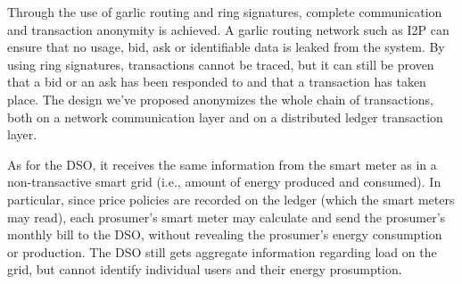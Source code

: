 
Through the use of garlic routing and ring signatures, complete communication and transaction anonymity is achieved. A garlic routing network such as I2P can ensure that no usage, bid, ask or identifiable data is leaked from the system. By using ring signatures, transactions cannot be traced, but it can still be proven that a bid or an ask has been responded to and that a transaction has taken place. The design we've proposed anonymizes the whole chain of transactions, both on a network communication layer and on a distributed ledger transaction layer.

As for the DSO, it receives the same information from the smart meter
as in a non-transactive smart grid (i.e., amount of energy
produced and consumed). In
particular, since price policies are recorded on the ledger (which the
smart meters may read), each prosumer's smart meter may calculate and
send the prosumer's monthly bill to the DSO, without revealing the
prosumer's energy consumption or production. The DSO still gets aggregate information regarding load on the grid, but cannot identify individual users and their energy prosumption. 



